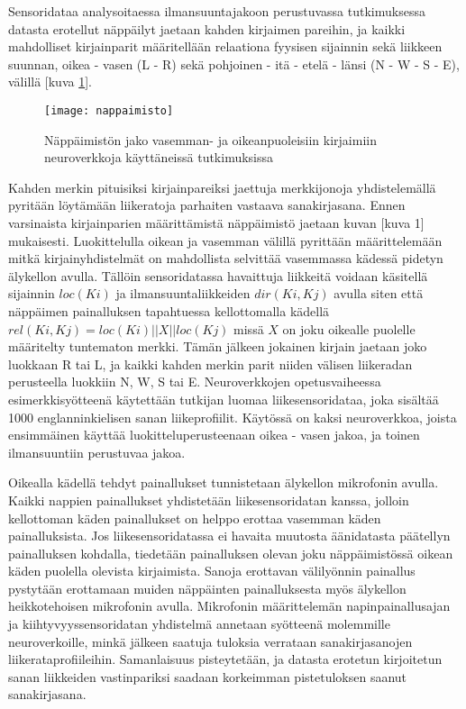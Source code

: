 \documentclass[finnish]{tktltiki2}
\theoremstyle{definition}
\theoremstyle{remark}
\begin{document}
Sensoridataa analysoitaessa ilmansuuntajakoon perustuvassa tutkimuksessa~\cite{maiti} datasta erotellut näppäilyt jaetaan kahden kirjaimen pareihin, ja kaikki mahdolliset kirjainparit määritellään relaationa fyysisen sijainnin sekä liikkeen suunnan, oikea - vasen (L - R) sekä pohjoinen - itä - etelä - länsi (N - W -
S - E), välillä [kuva \ref{fig:nappaimisto}].

\begin{figure}
\centering
\texttt{[image: nappaimisto]}
\caption{Näppäimistön jako vasemman- ja oikeanpuoleisiin kirjaimiin neuroverkkoja käyttäneissä tutkimuksissa~\cite{maiti}}
\label{fig:nappaimisto}
\end{figure}
\pagebreak
Kahden merkin pituisiksi kirjainpareiksi jaettuja merkkijonoja yhdistelemällä pyritään löytämään liikeratoja parhaiten vastaava sanakirjasana. Ennen varsinaista kirjainparien määrittämistä näppäimistö jaetaan kuvan [kuva 1] mukaisesti. Luokittelulla oikean ja vasemman välillä pyrittään määrittelemään mitkä kirjainyhdistelmät on mahdollista selvittää vasemmassa kädessä pidetyn älykellon avulla. Tällöin sensoridatassa havaittuja liikkeitä voidaan käsitellä sijainnin $loc(Ki)$ ja ilmansuuntaliikkeiden $dir(Ki, Kj)$ avulla siten että näppäimen painalluksen tapahtuessa kellottomalla kädellä $rel(Ki, Kj) = loc(Ki) || X || loc(Kj)$ missä $X$ on joku oikealle puolelle määritelty tuntematon merkki. Tämän jälkeen jokainen kirjain jaetaan joko luokkaan R tai L, ja kaikki kahden merkin parit niiden välisen liikeradan perusteella luokkiin N, W, S tai E.
Neuroverkkojen opetusvaiheessa esimerkkisyötteenä käytettään tutkijan luomaa liikesensoridataa, joka sisältää 1000 englanninkielisen sanan liikeprofiilit. Käytössä on kaksi neuroverkkoa, joista ensimmäinen käyttää luokitteluperusteenaan oikea - vasen jakoa, ja toinen ilmansuuntiin perustuvaa jakoa. 

Oikealla kädellä tehdyt painallukset tunnistetaan älykellon mikrofonin avulla. Kaikki nappien painallukset yhdistetään liikesensoridatan kanssa, jolloin kellottoman käden painallukset on helppo erottaa vasemman käden painalluksista. Jos liikesensoridatassa ei havaita muutosta äänidatasta päätellyn painalluksen kohdalla, tiedetään painalluksen olevan joku näppäimistössä oikean käden puolella olevista kirjaimista. Sanoja erottavan välilyönnin painallus pystytään erottamaan muiden näppäinten painalluksesta myös älykellon heikkotehoisen mikrofonin avulla. Mikrofonin määrittelemän napinpainallusajan ja kiihtyvyyssensoridatan yhdistelmä annetaan syötteenä molemmille neuroverkoille, minkä jälkeen saatuja tuloksia verrataan sanakirjasanojen liikerataprofiileihin. Samanlaisuus pisteytetään, ja datasta erotetun kirjoitetun sanan liikkeiden vastinpariksi saadaan korkeimman pistetuloksen saanut sanakirjasana. 
\end{document}
